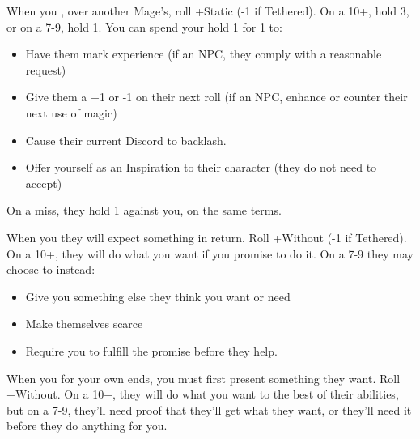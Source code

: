 



\begin{multicols}{3}

  \begin{move}
    When you  ,  over another Mage’s, roll +Static (-1 if Tethered). On a 10+, hold 3, or on a 7-9, hold 1. You can spend your hold 1 for 1 to:

    \begin{itemize}
      \setlength\itemsep{-.5em}
    \item Have them mark experience (if an NPC, they comply with a reasonable request)
    \item Give them a +1 or -1 on their next roll (if an NPC, enhance or counter their next use of magic)
    \item Cause their current Discord to backlash. 
    \item Offer yourself as an Inspiration to their character (they do not need to accept)
    \end{itemize}
    On a miss, they hold 1 against you, on the same terms.


  \end{move}

  \SEPARATOR

  \begin{move}
    When you   they will expect something in return. Roll +Without (-1 if Tethered). On a 10+, they will do what you want if you promise to do it. On a 7-9 they may choose to instead:

    \begin{itemize}
    \item Give you something else they think you want or need
    \item Make themselves scarce
    \item Require you to fulfill the promise before they help.
    \end{itemize}
  \end{move}

  \SEPARATOR

  \begin{move}
    When you   for your own ends, you must first present something they want. Roll +Without. On a 10+, they will do what you want to the best of their abilities, but on a 7-9, they’ll need proof that they’ll get what they want, or they’ll need it before they do anything for you.


\end{move}
\end{multicols}
